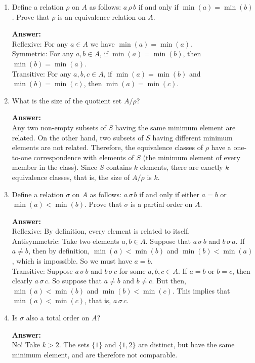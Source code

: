 \documentclass{article}
\begin{document}
\begin{enumerate}
    \item Define a relation $\rho$ on $A$ as follows: $a \,\rho\, b$ if and only if $\min(a) = \min(b)$. Prove that $\rho$ is an equivalence
    relation on $A$.  

    \textbf{Answer:}\\
    Reflexive: For any $a \in A$ we have $\min(a) = \min(a)$.\\
    Symmetric: For any $a,b \in A$, if $\min(a) = \min(b)$, then $\min(b) = \min(a)$.\\
    Transitive: For any $a,b,c \in A$, if $\min(a) = \min(b)$ and $\min(b) = \min(c)$, then $\min(a) = \min(c)$.  

    \item What is the size of the quotient set $A/\rho$?  

    \textbf{Answer:}\\
    Any two non-empty subsets of $S$ having the same minimum element are related. On the other hand, two subsets
    of $S$ having different minimum elements are not related. Therefore, the equivalence classes of $\rho$ have a one-to-one correspondence with elements of $S$ (the minimum element of every member in the class). Since $S$ contains
    $k$ elements, there are exactly $k$ equivalence classes, that is, the size of $A/\rho$ is $k$.  

    \item Define a relation $\sigma$ on $A$ as follows: $a \,\sigma\, b$ if and only if either $a = b$ or $\min(a) < \min(b)$. Prove that
    $\sigma$ is a partial order on $A$.  

    \textbf{Answer:}\\
    Reflexive: By definition, every element is related to itself.\\ 
    Antisymmetric: Take two elements $a,b \in A$. Suppose that $a \,\sigma\, b$ and $b \,\sigma\, a$. If $a \neq b$, then by definition,
    $\min(a) < \min(b)$ and $\min(b) < \min(a)$, which is impossible. So we must have $a = b$.\\
    Transitive: Suppose $a \,\sigma\, b$ and $b \,\sigma\, c$ for some $a,b,c \in A$. If $a = b$ or $b = c$, then clearly $a \,\sigma\, c$. So suppose
    that $a \neq b$ and $b \neq c$. But then, $\min(a) < \min(b)$ and $\min(b) < \min(c)$. This implies that $\min(a) < \min(c)$, that
    is, $a \,\sigma\, c$.  

    \item Is $\sigma$ also a total order on $A$?  

    \textbf{Answer:}\\
    No! Take $k > 2$. The sets $\{1\}$ and $\{1,2\}$ are distinct, but have the same minimum element, and are therefore
    not comparable.  
\end{enumerate}
\end{document}
